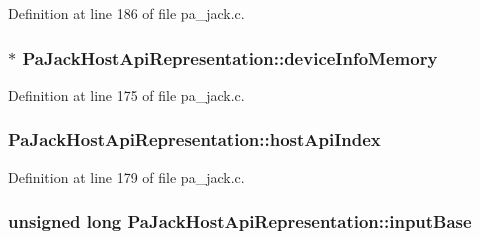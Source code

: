 Definition at line 186 of file pa\+\_\+jack.\+c.

\subsubsection[{\texorpdfstring{device\+Info\+Memory}{deviceInfoMemory}}]{$\ast$ Pa\+Jack\+Host\+Api\+Representation\+::device\+Info\+Memory}\hypertarget{struct_pa_jack_host_api_representation_a5665589d64d32a510b85346b23da38c0}{}\label{struct_pa_jack_host_api_representation_a5665589d64d32a510b85346b23da38c0}


Definition at line 175 of file pa\+\_\+jack.\+c.

\subsubsection[{\texorpdfstring{host\+Api\+Index}{hostApiIndex}}]{ Pa\+Jack\+Host\+Api\+Representation\+::host\+Api\+Index}\hypertarget{struct_pa_jack_host_api_representation_a6fb33fc101d36b95c209a0c6c696ec44}{}\label{struct_pa_jack_host_api_representation_a6fb33fc101d36b95c209a0c6c696ec44}


Definition at line 179 of file pa\+\_\+jack.\+c.

\subsubsection[{\texorpdfstring{input\+Base}{inputBase}}]{\setlength{\rightskip}{0pt plus 5cm}unsigned long Pa\+Jack\+Host\+Api\+Representation\+::input\+Base}\hypertarget{struct_pa_jack_host_api_representation_a898327259b30794d861226ac6c8ec54a}{}\label{struct_pa_jack_host_api_representation_a898327259b30794d861226ac6c8ec54a}


